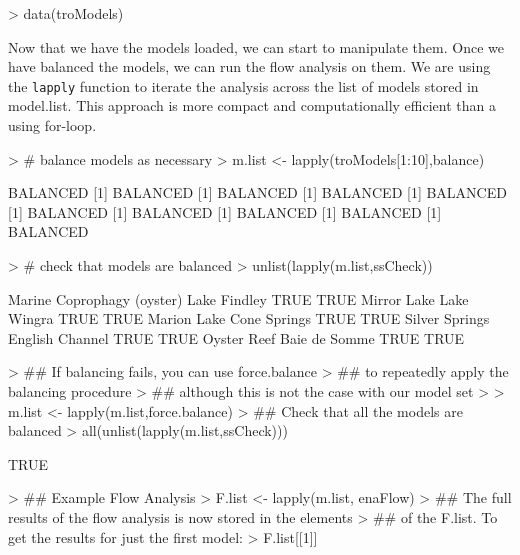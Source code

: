 \documentclass[article]{jss}
\begin{document}
\begin{Schunk}
\begin{Sinput}
> data(troModels)
\end{Sinput}
\end{Schunk}

Now that we have the models loaded, we can start to manipulate them.
Once we have balanced the models, we can run the flow analysis on
them.  We are using the \texttt{lapply} function to iterate the
analysis across the list of models stored in model.list. This approach
is more compact and computationally efficient than a using for-loop.


\begin{Schunk}
\begin{Sinput}
> # balance models as necessary
> m.list <- lapply(troModels[1:10],balance)
\end{Sinput}
\begin{Soutput}
[1] BALANCED
[1] BALANCED
[1] BALANCED
[1] BALANCED
[1] BALANCED
[1] BALANCED
[1] BALANCED
[1] BALANCED
[1] BALANCED
[1] BALANCED
\end{Soutput}
\begin{Sinput}
> # check that models are balanced
> unlist(lapply(m.list,ssCheck))
\end{Sinput}
\begin{Soutput}
Marine Coprophagy (oyster)              Lake Findley  
                      TRUE                       TRUE 
               Mirror Lake                Lake Wingra 
                      TRUE                       TRUE 
               Marion Lake               Cone Springs 
                      TRUE                       TRUE 
            Silver Springs            English Channel 
                      TRUE                       TRUE 
              Oyster Reef               Baie de Somme 
                      TRUE                       TRUE 
\end{Soutput}
\begin{Sinput}
> ## If balancing fails, you can use force.balance
> ## to repeatedly apply the balancing procedure
> ## although this is not the case with our model set
> 
> m.list <- lapply(m.list,force.balance)
> ## Check that all the models are balanced
> all(unlist(lapply(m.list,ssCheck)))
\end{Sinput}
\begin{Soutput}
[1] TRUE
\end{Soutput}
\begin{Sinput}
> ## Example Flow Analysis
> F.list <- lapply(m.list, enaFlow)
> ## The full results of the flow analysis is now stored in the elements
> ## of the F.list.  To get the results for just the first model:
> F.list[[1]]
\end{Sinput}
\end{Schunk}
\end{document}
